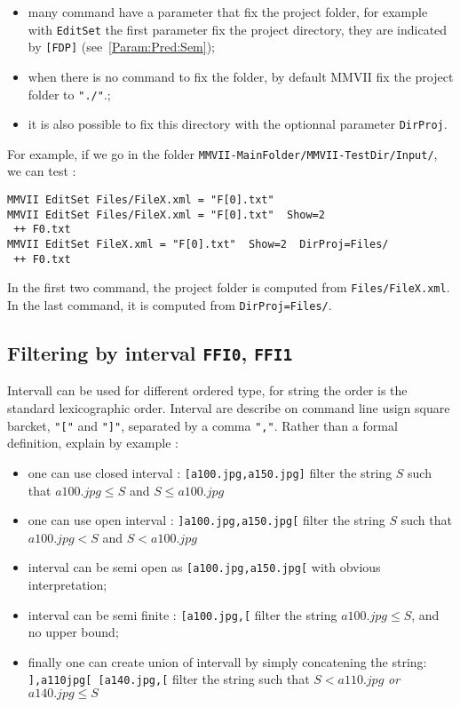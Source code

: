 \documentclass[a4paper]{book}
\newcommand{\PPP}{MMVII}
\newcommand{\MMVIDIR}{{\tt MMVII-MainFolder/}}
\begin{document}
\begin{itemize}
   \item  many command have a parameter that fix the project folder,
          for example with {\tt EditSet} the first parameter fix the 
          project directory, they are indicated by {\tt [FDP]} (see~\ref{Param:Pred:Sem});

   \item  when there is no command to fix the folder, by default \PPP
          fix the project folder to {\tt "./"}.;

    \item it is also possible to fix this directory with the optionnal
          parameter  {\tt DirProj}.
\end{itemize}

For example, if we go in the folder   {\tt {\MMVIDIR}MMVII-TestDir/Input/}, we can test :

\begin{verbatim}
MMVII EditSet Files/FileX.xml = "F[0].txt"   
MMVII EditSet Files/FileX.xml = "F[0].txt"  Show=2  
 ++ F0.txt
MMVII EditSet FileX.xml = "F[0].txt"  Show=2  DirProj=Files/
 ++ F0.txt
\end{verbatim}

In the first two command, the project folder is computed from {\tt Files/FileX.xml}.
In the last command, it is computed from {\tt DirProj=Files/}.




\subsection{Filtering by interval {\tt FFI0}, {\tt FFI1}}

Intervall can be used for different  ordered type, for string the order
is the standard lexicographic order. Interval are describe on command
line usign square barcket, {\tt "["} and  {\tt "]"}, separated by a comma {\tt ","}.
Rather than a formal definition, explain by example :

\begin{itemize}
   \item one can use closed interval : {\tt [a100.jpg,a150.jpg]} filter the string $S$ such that   $ a100.jpg \leq S $ and  $ S \leq a100.jpg $ 
   \item one can use open interval  : {\tt ]a100.jpg,a150.jpg[} filter the string $S$ such that   $ a100.jpg <  S $ and  $ S < a100.jpg $ 
   \item interval can be semi open as  {\tt [a100.jpg,a150.jpg[} with obvious interpretation;
   \item interval can be semi finite :  {\tt [a100.jpg,[} filter the string  $ a100.jpg \leq S $, and no upper bound;
   \item finally one can create union of intervall by simply concatening the string: {\tt  ],a110jpg[ [a140.jpg,[}
         filter the string such that  $ S < a110.jpg $ \emph{or}  $  a140.jpg \leq S $
       
\end{itemize}
\end{document}
